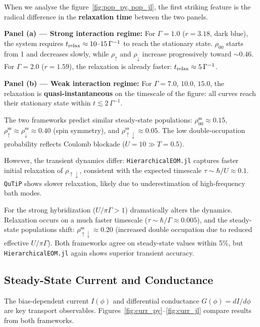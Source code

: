 \documentclass[preprint,1p]{elsarticle}
\begin{document}
When we analyse the figure~\ref{fig:pop_py, pop_jl}, the first striking feature is the radical difference in the
\textbf{relaxation time} between the two panels.

\textbf{Panel (a) — Strong interaction regime:}
For $\Gamma = 1.0$ ($r = 3.18$, dark blue), the system
requires $t_{\rm relax} \approx 10\text{--}15\,\Gamma^{-1}$ to
reach the stationary state. $\rho_{00}$ starts from 1 and
decreases slowly, while $\rho_{\uparrow}$ and $\rho_{\downarrow}$
increase progressively toward $\sim 0.46$.
For $\Gamma = 2.0$ ($r = 1.59$), the relaxation is already
faster: $t_{\rm relax} \approx 5\,\Gamma^{-1}$.

\textbf{Panel (b) — Weak interaction regime:}
For $\Gamma = 7.0$, $10.0$, $15.0$, the relaxation is
\textbf{quasi-instantaneous} on the timescale of the figure:
all curves reach their stationary state
within $t \lesssim 2\,\Gamma^{-1}$.

The two frameworks predict similar steady-state populations: $\rho_{00}^{\text{ss}} \approx 0.15$, $\rho_{\uparrow}^{\text{ss}} \approx \rho_{\downarrow}^{\text{ss}} \approx 0.40$ (spin symmetry), and $\rho_{\uparrow\downarrow}^{\text{ss}} \approx 0.05$. The low double-occupation probability reflects Coulomb blockade ($U = 10 \gg T = 0.5$).

However, the transient dynamics differ: \texttt{HierarchicalEOM.jl} captures faster initial relaxation of $\rho_{\uparrow\downarrow}$, consistent with the expected timescale $\tau \sim \hbar/U \approx 0.1$. \texttt{QuTiP} shows slower relaxation, likely due to underestimation of high-frequency bath modes.


For the strong hybridization ($U/\pi\Gamma>1$) dramatically alters the dynamics. Relaxation occurs on a much faster timescale ($\tau \sim \hbar/\Gamma \approx 0.005$), and the steady-state populations shift: $\rho_{\uparrow\downarrow}^{\text{ss}} \approx 0.20$ (increased double occupation due to reduced effective $U/\pi\Gamma$). Both frameworks agree on steady-state values within 5\%, but \texttt{HierarchicalEOM.jl} again shows superior transient accuracy.


\subsection{Steady-State Current and Conductance}

The bias-dependent current $I(\phi)$ and differential conductance $G(\phi) = dI/d\phi$ are key transport observables. Figures~\ref{fig:curr_py}--\ref{fig:curr_jl} compare results from both frameworks.
\end{document}
